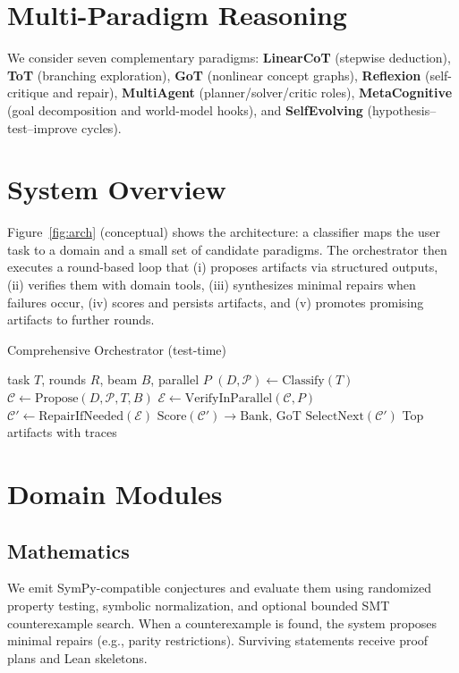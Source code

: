 \documentclass[11pt]{article}
\begin{document}
\section{Multi-Paradigm Reasoning}
We consider seven complementary paradigms:
\textbf{LinearCoT} (stepwise deduction),
\textbf{ToT} (branching exploration),
\textbf{GoT} (nonlinear concept graphs),
\textbf{Reflexion} (self-critique and repair),
\textbf{MultiAgent} (planner/solver/critic roles),
\textbf{MetaCognitive} (goal decomposition and world-model hooks),
and \textbf{SelfEvolving} (hypothesis--test--improve cycles).

\section{System Overview}
Figure~\ref{fig:arch} (conceptual) shows the architecture:
a classifier maps the user task to a domain and a small set of
candidate paradigms. The orchestrator then executes a round-based
loop that (i) proposes artifacts via structured outputs,
(ii) verifies them with domain tools, (iii) synthesizes minimal repairs
when failures occur, (iv) scores and persists artifacts, and
(v) promotes promising artifacts to further rounds.

\begin{algorithm}[t]
\caption{Comprehensive Orchestrator (test-time)}
\begin{algorithmic}[1]
\Require task $T$, rounds $R$, beam $B$, parallel $P$
\State $(D, \mathcal{P}) \gets \text{Classify}(T)$ 
  \State $\mathcal{C} \gets \text{Propose}(D, \mathcal{P}, T, B)$ 
  \State $\mathcal{E} \gets \text{VerifyInParallel}(\mathcal{C}, P)$ 
  \State $\mathcal{C}' \gets \text{RepairIfNeeded}(\mathcal{E})$
  \State $\text{Score}(\mathcal{C}') \rightarrow \text{Bank, GoT}$
  \State $\text{SelectNext}(\mathcal{C}')$
\EndFor
\State \Return Top artifacts with traces
\end{algorithmic}
\end{algorithm}

\section{Domain Modules}
\subsection{Mathematics}
We emit SymPy-compatible conjectures and evaluate them using
randomized property testing, symbolic normalization, and optional
bounded SMT counterexample search. When a counterexample is found,
the system proposes minimal repairs (e.g., parity restrictions).
Surviving statements receive proof plans and Lean skeletons.
\end{document}
